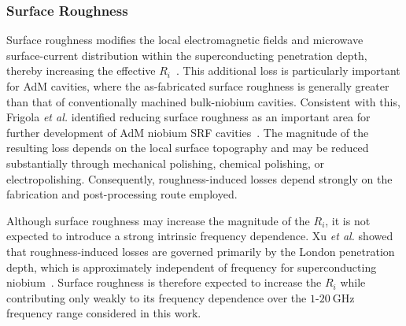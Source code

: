 \documentclass[
  aps,
  physrev,
  reprint,
  superscriptaddress,
  nofootinbib,
  amsmath,
  amssymb
]{revtex4-2}
\begin{document}
\subsubsection[\appendixname~\thesubsubsection]{Surface Roughness}
\label{app:Rs_roughness}

Surface roughness modifies the local electromagnetic fields and microwave surface-current distribution within the superconducting penetration depth, thereby increasing the effective $R_i$~\cite{Xu2018}. This additional loss is particularly important for AdM cavities, where the as-fabricated surface roughness is generally greater than that of conventionally machined bulk-niobium cavities. Consistent with this, Frigola \textit{et al.} identified reducing surface roughness as an important area for further development of AdM niobium SRF cavities~\cite{Frigola2015}. The magnitude of the resulting loss depends on the local surface topography and may be reduced substantially through mechanical polishing, chemical polishing, or electropolishing. Consequently, roughness-induced losses depend strongly on the fabrication and post-processing route employed.



Although surface roughness may increase the magnitude of the $R_i$, it is not expected to introduce a strong intrinsic frequency dependence. Xu \textit{et al.} showed that roughness-induced losses are governed primarily by the London penetration depth, which is approximately independent of frequency for superconducting niobium~\cite{Xu2018}. Surface roughness is therefore expected to increase the $R_i$ while contributing only weakly to its frequency dependence over the $1$-$20~\mathrm{GHz}$ frequency range considered in this work.
\end{document}
